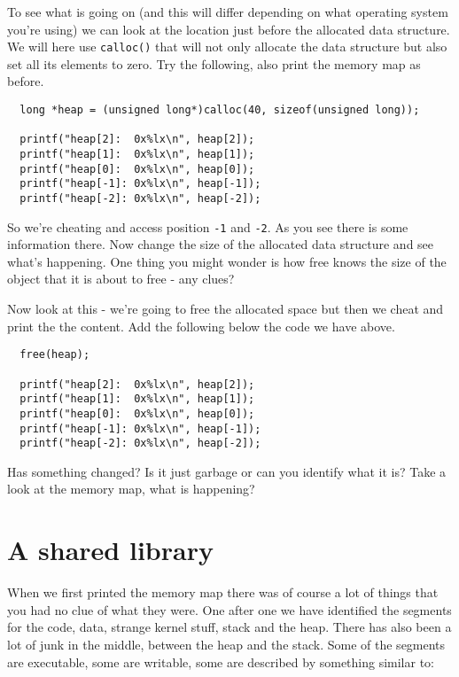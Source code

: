 \documentclass[a4paper,11pt]{article}
\begin{document}
To see what is going on (and this will differ depending on what
operating system you're using) we can look at the location just before
the allocated data structure. We will here use {\tt calloc()} that
will not only allocate the data structure but also set all its elements
to zero. Try the following, also print the memory map as before.

\begin{lstlisting}
  long *heap = (unsigned long*)calloc(40, sizeof(unsigned long));

  printf("heap[2]:  0x%lx\n", heap[2]);          
  printf("heap[1]:  0x%lx\n", heap[1]);        
  printf("heap[0]:  0x%lx\n", heap[0]);      
  printf("heap[-1]: 0x%lx\n", heap[-1]);      
  printf("heap[-2]: 0x%lx\n", heap[-2]);
\end{lstlisting}

So we're cheating and access position {\tt -1} and {\tt -2}. As you
see there is some information there. Now change the size of the
allocated data structure and see what's happening. One thing you might
wonder is how free knows the size of the object that it is about to
free - any clues?

Now look at this - we're going to free the allocated space but then we
cheat and print the the content. Add the following below the code we have above.

\begin{lstlisting}
  free(heap);

  printf("heap[2]:  0x%lx\n", heap[2]);          
  printf("heap[1]:  0x%lx\n", heap[1]);        
  printf("heap[0]:  0x%lx\n", heap[0]);      
  printf("heap[-1]: 0x%lx\n", heap[-1]);      
  printf("heap[-2]: 0x%lx\n", heap[-2]);
\end{lstlisting}

Has something changed? Is it just garbage or can you identify what it
is? Take a look at the memory map, what is happening?


\section{A shared library}

When we first printed the memory map there was of course a lot of
things that you had no clue of what they were. One after one we have
identified the segments for the code, data, strange kernel stuff,
stack and the heap. There has also been a lot of junk in the middle,
between the heap and the stack. Some of the segments are executable,
some are writable, some are described by something similar to:
\end{document}
